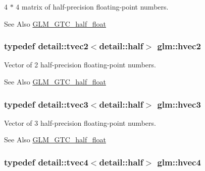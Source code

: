 4 $\ast$ 4 matrix of half-\/precision floating-\/point numbers. 

\begin{DoxySeeAlso}{See Also}
\hyperlink{group__gtc__half__float}{G\-L\-M\-\_\-\-G\-T\-C\-\_\-half\-\_\-float} 
\end{DoxySeeAlso}
\hypertarget{group__gtc__half__float_gafad70a9362e123cafc2807e93c292173}{
\subsubsection[{hvec2}]{\setlength{\rightskip}{0pt plus 5cm}typedef detail\-::tvec2$<$detail\-::half$>$ {\bf glm\-::hvec2}}}\label{group__gtc__half__float_gafad70a9362e123cafc2807e93c292173}


Vector of 2 half-\/precision floating-\/point numbers. 

\begin{DoxySeeAlso}{See Also}
\hyperlink{group__gtc__half__float}{G\-L\-M\-\_\-\-G\-T\-C\-\_\-half\-\_\-float} 
\end{DoxySeeAlso}
\hypertarget{group__gtc__half__float_ga7f3d584efe4e61946fb06ce920b6919f}{
\subsubsection[{hvec3}]{\setlength{\rightskip}{0pt plus 5cm}typedef detail\-::tvec3$<$detail\-::half$>$ {\bf glm\-::hvec3}}}\label{group__gtc__half__float_ga7f3d584efe4e61946fb06ce920b6919f}


Vector of 3 half-\/precision floating-\/point numbers. 

\begin{DoxySeeAlso}{See Also}
\hyperlink{group__gtc__half__float}{G\-L\-M\-\_\-\-G\-T\-C\-\_\-half\-\_\-float} 
\end{DoxySeeAlso}
\hypertarget{group__gtc__half__float_ga377f6d7c1e25bda8eb1393f5cc74acd4}{
\subsubsection[{hvec4}]{\setlength{\rightskip}{0pt plus 5cm}typedef detail\-::tvec4$<$detail\-::half$>$ {\bf glm\-::hvec4}}}\label{group__gtc__half__float_ga377f6d7c1e25bda8eb1393f5cc74acd4}


